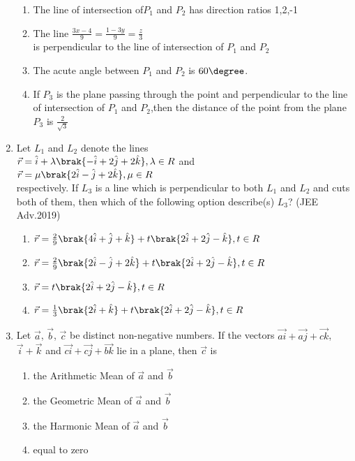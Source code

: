 \begin{enumerate}
		\begin{enumerate}
			\item The line of intersection of$P_1$ and $P_2$ has direction ratios 1,2,-1
			\item The line $\frac{3x-4}{9}=\frac{1-3y}{9}=\frac{z}{3}$ \\ is perpendicular to the line of intersection of $P_1$ and $P_2$
			\item The acute angle between $P_1$ and $P_2$ is $60\degree$.
			\item If $P_3$ is the plane passing through the point  and perpendicular to the line of intersection of $P_1$ and $P_2$,then the distance of the point 
				from the plane $P_3$ is $\frac{2}{\sqrt{3}}$
		\end{enumerate}
	\item Let $L_1$ and $L_2$ denote the lines\\ $\vec{r}=\hat{i}+\lambda\brak{-\hat{i}+2\hat{j}+2\hat{k}}, \lambda \in R$ and \\
		$\vec{r}=\mu \brak{2\hat{i}-\hat{j}+2\hat{k}}, \mu \in R$\\ respectively. If $L_3$ is a line which is perpendicular to both $L_1$ and $L_2$ and cuts both of them, then which of 
		the following option describe(s) $L_3$? \hfill{(JEE Adv.2019)}
		\begin{enumerate}
			\item $\vec{r}=\frac{2}{9}\brak{4\hat{i}+\hat{j}+\hat{k}}+t\brak{2\hat{i}+2\hat{j}-\hat{k}},t \in R$
			\item $\vec{r}=\frac{2}{9}\brak{2\hat{i}-\hat{j}+2\hat{k}}+t\brak{2\hat{i}+2\hat{j}-\hat{k}}, t \in R$
			\item $\vec{r}=t\brak{2\hat{i}+2\hat{j}-\hat{k}},t \in R$
			\item $\vec{r}=\frac{1}{3}\brak{2\hat{i}+\hat{k}}+t\brak{2\hat{i}+2\hat{j}-\hat{k}},t \in R$
		\end{enumerate}
\item Let $\vec{a}$, $\vec{b}$, $\vec{c}$ be distinct non-negative numbers. If the vectors $\vec{ai} + \vec{aj} + \vec{ck}$, $\vec{i}+\vec{k}$ and $\vec{ci}+\vec{cj}+\vec{bk}$ lie in a plane, then $\vec{c}$ is
\begin{enumerate}
\item the Arithmetic Mean of $\vec{a}$ and $\vec{b}$
\item the Geometric Mean of $\vec{a}$ and $\vec{b}$
\item the Harmonic Mean of $\vec{a}$ and $\vec{b}$
\item equal to zero

\end{enumerate}
\end{enumerate}
